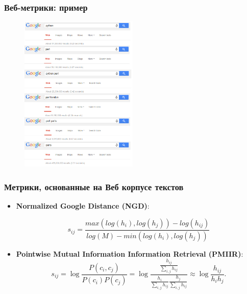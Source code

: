 \begin{frame}
\frametitle{ Веб-метрики: пример }

 \begin{figure}
  \centering
   \includegraphics[width=0.5\textwidth]{./figures/google-web}
 \end{figure}

\end{frame}







\begin{frame}
\frametitle{Метрики, основанные на Веб корпусе текстов }

\begin{itemize}
\item \textbf{Normalized Google Distance (NGD)}: 
 
 $$ s_{ij}=\frac{max(log(h_i), log(h_j))-log(h_{ij})}{log(M)-min(log(h_i),log(h_j))} $$

\item \textbf{Pointwise Mutual Information Information Retrieval (PMIIR)}:
$$
s_{ij}= \log \frac{P(c_i,c_j)}{P(c_i) P(c_j)} = \log \frac{ \frac{h_{ij}}{\sum_{i,j} h_{ij}} }{ \frac{h_{i}}{\sum_{i,j} h_{ij}} \frac{h_{j}}{\sum_{i,j} h_{ij}} } \approx \log \frac{h_{ij} }{h_i h_j} .
$$

\end{itemize}

\end{frame}








